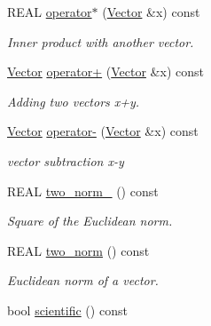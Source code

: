 \begin{DoxyCompactItemize}
\item 
REAL \hyperlink{classhdnum_1_1Vector_aef63f9bb0fd5490d989317559ab5417e}{operator$\ast$} (\hyperlink{classhdnum_1_1Vector}{Vector} \&x) const 
\begin{DoxyCompactList}\small\item\em Inner product with another vector. \item\end{DoxyCompactList}\item 
\hyperlink{classhdnum_1_1Vector}{Vector} \hyperlink{classhdnum_1_1Vector_a15b3fcda96f788a4de617d24f6974647}{operator+} (\hyperlink{classhdnum_1_1Vector}{Vector} \&x) const 
\begin{DoxyCompactList}\small\item\em Adding two vectors x+y. \item\end{DoxyCompactList}\item 
\hyperlink{classhdnum_1_1Vector}{Vector} \hyperlink{classhdnum_1_1Vector_af44713378f5150c2d12a981e6641f09a}{operator-\/} (\hyperlink{classhdnum_1_1Vector}{Vector} \&x) const 
\begin{DoxyCompactList}\small\item\em vector subtraction x-\/y \item\end{DoxyCompactList}\item 
\hypertarget{classhdnum_1_1Vector_a861d14f56f15f030baa8e77a6fd7294d}{
REAL \hyperlink{classhdnum_1_1Vector_a861d14f56f15f030baa8e77a6fd7294d}{two\_\-norm\_} () const }
\label{classhdnum_1_1Vector_a861d14f56f15f030baa8e77a6fd7294d}

\begin{DoxyCompactList}\small\item\em Square of the Euclidean norm. \item\end{DoxyCompactList}\item 
REAL \hyperlink{classhdnum_1_1Vector_a5d44d50fe956733a43a59300c559c13c}{two\_\-norm} () const 
\begin{DoxyCompactList}\small\item\em Euclidean norm of a vector. \item\end{DoxyCompactList}\item 
\hypertarget{classhdnum_1_1Vector_ae95ec8cc3365696d65b4c7a51c61522d}{
bool \hyperlink{classhdnum_1_1Vector_ae95ec8cc3365696d65b4c7a51c61522d}{scientific} () const }
\label{classhdnum_1_1Vector_ae95ec8cc3365696d65b4c7a51c61522d}


\end{DoxyCompactItemize}
